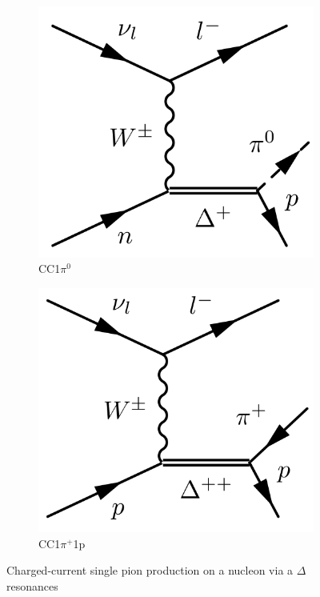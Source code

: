 \begin{figure}[h]
\begin{subfigure}[t]{0.32\textwidth}
		\includegraphics[width=\textwidth, trim={0mm 0mm 0mm 0mm}, clip,page=1]{figures/niwg/diagrams/CC1pi0}
		\caption{CC1$\pi^0$}
	\end{subfigure}
	\begin{subfigure}[t]{0.32\textwidth}
		\includegraphics[width=\textwidth, trim={0mm 0mm 0mm 0mm}, clip,page=1]{figures/niwg/diagrams/CC1ppip}
		\caption{CC1$\pi^+$1p}
	\end{subfigure}
	\caption{Charged-current single pion production on a nucleon via a $\Delta$ resonances}
	\label{fig:1pi_diags}
\end{figure}

